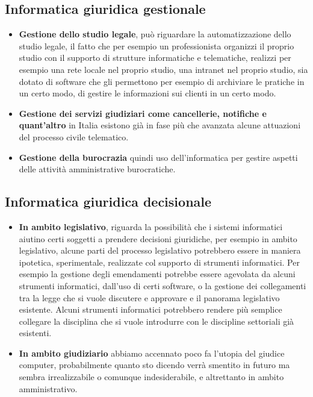 \subsection{ Informatica giuridica gestionale}
\begin{itemize}
    \item \textbf{Gestione dello studio legale}, può riguardare la automatizzazione dello studio legale, il fatto che per esempio un professionista organizzi il proprio studio con il supporto di strutture informatiche e telematiche, realizzi per esempio una rete locale nel proprio studio, una intranet nel proprio studio, sia dotato di software che gli permettono per esempio di archiviare le pratiche in un certo modo, di gestire le informazioni sui clienti in un certo modo.
    \item \textbf{Gestione dei servizi giudiziari come cancellerie, notifiche e quant'altro} in Italia esistono già in fase più che avanzata alcune attuazioni del processo civile telematico.  
        \item \textbf{Gestione della burocrazia} quindi uso dell'informatica per gestire aspetti delle attività amministrative burocratiche.
\end{itemize}

\subsection{Informatica giuridica decisionale}
\begin{itemize}
    \item \textbf{In ambito legislativo}, riguarda la possibilità che i sistemi informatici aiutino certi soggetti a prendere decisioni giuridiche, per esempio in ambito legislativo, alcune parti del processo legislativo potrebbero essere in maniera ipotetica, sperimentale, realizzate col supporto di strumenti informatici. Per esempio la gestione degli emendamenti potrebbe essere agevolata da alcuni strumenti informatici, dall'uso di certi software, o la gestione dei collegamenti tra la legge che si vuole discutere e approvare e il panorama legislativo esistente. Alcuni strumenti informatici potrebbero rendere più semplice collegare la disciplina che si vuole introdurre con le discipline settoriali già esistenti.  
    \item \textbf{In ambito giudiziario} abbiamo accennato poco fa l'utopia del giudice computer, probabilmente quanto sto dicendo verrà smentito in futuro ma sembra irrealizzabile o comunque indesiderabile, e altrettanto in ambito amministrativo.  
\end{itemize}

